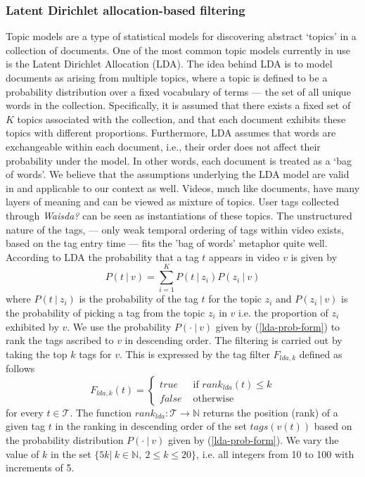 \subsubsection{Latent Dirichlet allocation-based filtering}
Topic models \cite{Hofmann, Blei} are a type of statistical models for discovering abstract `topics' in a collection of documents. One of the most common topic models currently in use is the  Latent Dirichlet Allocation (LDA). The idea behind LDA is to model documents as arising from multiple topics, where a topic is defined to be a probability distribution over a fixed vocabulary of terms --- the set of all unique words in the collection. Specifically, it is assumed that there exists a fixed set of $\mathit{K}$ topics associated with the collection, and that each document exhibits these topics with different proportions. Furthermore, LDA assumes that words are exchangeable within each document, i.e., their order does not affect their probability under the model. In other words, each document is treated as a `bag of words'. We believe that the assumptions underlying the LDA model are valid in and applicable to our context as well. Videos, much like documents, have many layers of meaning and can be viewed as mixture of topics. User tags collected through \textit{Waisda?} can be seen as instantiations of these topics.  The unstructured nature of the tags, --- only weak temporal ordering of tags within video exists, based on the tag entry time --- fits the 'bag of words' metaphor quite well. According to LDA the probability that a tag $t$ appears in video $v$  is given by
\begin{equation}\label{lda-prob-form}
	P(t~|~v) = \sum_{i = 1}^{\mathit{K}}{P(t~|~z_i) P(z_i~|~v)}
\end{equation}
where $P(t~|~z_i)$ is the probability of the tag $t$ for the topic $z_i$ and $P(z_i~|~v)$ is the probability of picking a tag from the topic $z_i$ in $v$ i.e. the proportion of $z_i$ exhibited by $v$. We use the probability  $P(\cdot~|~v)$ given by (\ref{lda-prob-form}) to rank the tags ascribed to $v$ in descending order. The filtering is carried out by taking the top $k$ tags for $v$. This is expressed by the tag filter  $F_{lda,k}$ defined as follows
\begin{equation}
F_{lda,k}(t) = \left\{ 
	\begin{array}{rl}
	true &\mbox{ if $rank_{lda}(t) \leq k$} \\
	false &\mbox{ otherwise}
	\end{array}
\right.
\end{equation}
for every $t \in \mathcal{T}$. The function $rank_{lda}: \mathcal{T} \rightarrow \mathbb{N}$ returns the  position (rank) of a given tag $t$ in the ranking in descending order of the set $tags(v(t))$ based on the probability distribution $P(\cdot~|~v)$ given by (\ref{lda-prob-form}).  We vary the value of $k$ in the set $\{5k|~k\in \mathbb{N},~2 \leq k \leq 20\}$, i.e. all integers from 10 to 100 with increments of 5.


